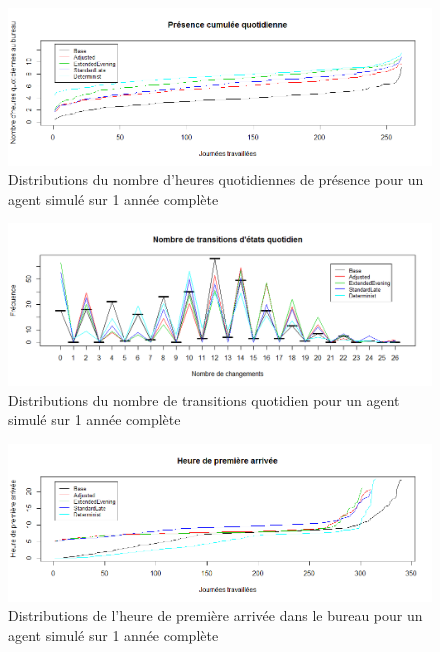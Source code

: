 \begin{figure}
\centering
\includegraphics[scale=0.45]{Images/PageActivities/PresenceCumulee}
\caption{Distributions du nombre d'heures quotidiennes de présence pour un agent simulé sur 1 année complète}
\label{fig:PresenceCumulee}
\end{figure}

\begin{figure}
\centering
\includegraphics[scale=0.45]{Images/PageActivities/NbTransitions}
\caption{Distributions du nombre de transitions quotidien pour un agent simulé sur 1 année complète}
\label{fig:NbTransitions}
\end{figure}

\begin{figure}
\centering
\includegraphics[scale=0.45]{Images/PageActivities/PremiereArrivee}
\caption{Distributions de l'heure de première arrivée dans le bureau pour un agent simulé sur 1 année complète}
\label{fig:PremiereArrivee}
\end{figure}

